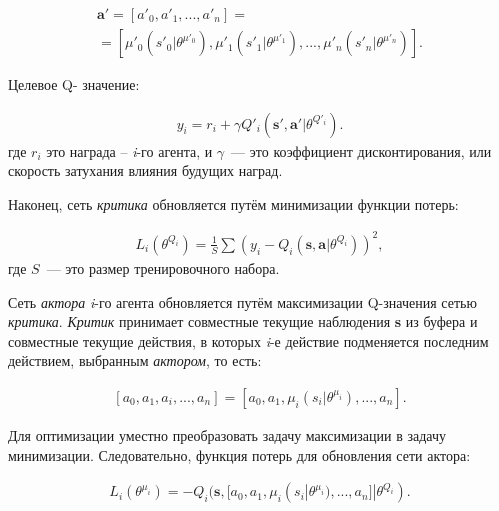 \begin{equation}
    \begin{multlined}
        \mathbf{a'} = [a'_0, a'_1, ..., a'_n] = \\
        = [\mu'_0(s'_0|\theta^{\mu'_0}), \mu'_1(s'_1|\theta^{\mu'_1}), ..., \mu'_n(s'_n|\theta^{\mu'_n})].
    \end{multlined}
\end{equation}

Целевое Q- значение:

\begin{equation}
    \begin{multlined}
        y_i = r_i + \gamma Q'_i(\mathbf{s', a'}|\theta^{Q'_i}).
    \end{multlined}
\end{equation}
где $r_i$ это награда – \textit{i}-го агента, и $\gamma$~--- это коэффициент дисконтирования, или скорость затухания влияния будущих наград.

Наконец, сеть \textit{критика} обновляется путём минимизации функции потерь:

\begin{equation}
    \begin{multlined}
        L_i(\theta^{Q_i}) = \frac{1}{S} \sum (y_i - Q_i(\mathbf{s, a}|\theta^{Q_i}))^2,
    \end{multlined}
\end{equation}
где $S$~--- это размер тренировочного набора.

Сеть \textit{актора} \textit{i}-го агента обновляется путём максимизации Q-значения сетью \textit{критика}. \textit{Критик} принимает совместные текущие наблюдения \textbf{s} из буфера и совместные текущие действия, в которых \textit{i}-е действие подменяется последним действием, выбранным \textit{актором}, то есть:

\begin{equation}
    \begin{multlined}
    [a_0, a_1, a_i, ..., a_n]
        = [a_0, a_1, \mu_i(s_i|\theta^{\mu_i}), ..., a_n].
    \end{multlined}
\end{equation}

Для оптимизации уместно преобразовать задачу максимизации в задачу минимизации. Следовательно, функция потерь для обновления сети актора:

\begin{equation}
    \begin{multlined}
        L_i(\theta^{\mu_i}) = -Q_i(\mathbf{s}, [a_0, a_1, \mu_i(s_i|\theta^{\mu_i}), ..., a_n]|\theta^{Q_i}).
    \end{multlined}
\end{equation}

